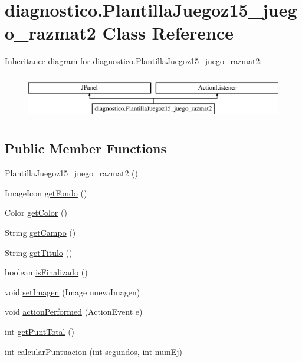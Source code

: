 \hypertarget{classdiagnostico_1_1_plantilla_juegoz15__juego__razmat2}{}\section{diagnostico.\+Plantilla\+Juegoz15\+\_\+juego\+\_\+razmat2 Class Reference}
\label{classdiagnostico_1_1_plantilla_juegoz15__juego__razmat2}
Inheritance diagram for diagnostico.\+Plantilla\+Juegoz15\+\_\+juego\+\_\+razmat2\+:\begin{figure}[H]
\begin{center}
\leavevmode
\includegraphics[height=2.000000cm]{classdiagnostico_1_1_plantilla_juegoz15__juego__razmat2}
\end{center}
\end{figure}
\subsection*{Public Member Functions}
\begin{DoxyCompactItemize}
\item 
\mbox{\hyperlink{classdiagnostico_1_1_plantilla_juegoz15__juego__razmat2_a179c1f7060280a66caf6ffd34dcf9704}{Plantilla\+Juegoz15\+\_\+juego\+\_\+razmat2}} ()
\item 
Image\+Icon \mbox{\hyperlink{classdiagnostico_1_1_plantilla_juegoz15__juego__razmat2_a3ecb3c8cedf71d93288336395035a7a1}{get\+Fondo}} ()
\item 
Color \mbox{\hyperlink{classdiagnostico_1_1_plantilla_juegoz15__juego__razmat2_a1b27095a9a304c627e6d991451ee5f55}{get\+Color}} ()
\item 
String \mbox{\hyperlink{classdiagnostico_1_1_plantilla_juegoz15__juego__razmat2_a6d2d0ed8ebf67a74835e6355f10e7a5f}{get\+Campo}} ()
\item 
String \mbox{\hyperlink{classdiagnostico_1_1_plantilla_juegoz15__juego__razmat2_ae6c9bd97d3db455d120e08cf2d702fb3}{get\+Titulo}} ()
\item 
boolean \mbox{\hyperlink{classdiagnostico_1_1_plantilla_juegoz15__juego__razmat2_acbf2dfe6bb15ddebf6f271aec2109ef5}{is\+Finalizado}} ()
\item 
void \mbox{\hyperlink{classdiagnostico_1_1_plantilla_juegoz15__juego__razmat2_a90ca39e482ba78e25c8c26da59776221}{set\+Imagen}} (Image nueva\+Imagen)
\item 
void \mbox{\hyperlink{classdiagnostico_1_1_plantilla_juegoz15__juego__razmat2_a28115bc805d5b26819eaa65ef4a4d0b1}{action\+Performed}} (Action\+Event e)
\item 
int \mbox{\hyperlink{classdiagnostico_1_1_plantilla_juegoz15__juego__razmat2_a5a9d9b2696d7f91551353c3153347bab}{get\+Punt\+Total}} ()
\item 
int \mbox{\hyperlink{classdiagnostico_1_1_plantilla_juegoz15__juego__razmat2_a83ca24356741b3002ebe80df4e3cce0c}{calcular\+Puntuacion}} (int segundos, int num\+Ej)
\end{DoxyCompactItemize}
